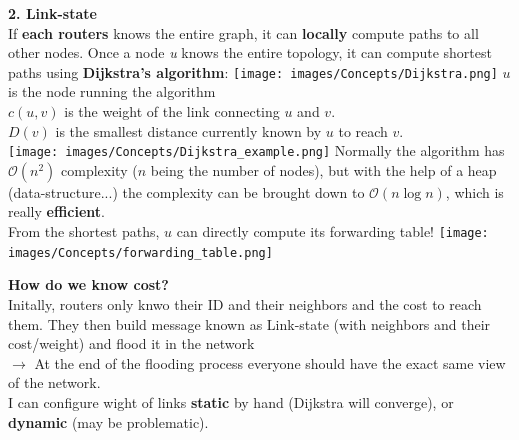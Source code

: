 \documentclass[a4paper, fontsize=8pt, landscape, DIV=1]{scrartcl}
\begin{document}
\begin{multicols*}{4}
		\textbf{2. Link-state}\\
		If \textbf{each routers} knows the entire graph, it can \textbf{locally}
		compute paths to all other nodes. Once a node \textit{u} knows the entire
		topology, it can compute shortest paths using \textbf{Dijkstra's algorithm}:
		\texttt{[image: images/Concepts/Dijkstra.png]}
		$u$ is the node running the algorithm\\
		$c(u,v)$ is the weight of the link connecting $u$ and $v$. \\
		$D(v)$ is the smallest distance currently known by $u$ to reach $v$.\\
		\texttt{[image: images/Concepts/Dijkstra\_example.png]} 
		Normally the algorithm has $\mathcal{O}(n^2)$ complexity ($n$ being the
		number of nodes), but with the help of a heap (data-structure...) the complexity
		can be brought down to $\mathcal{O}(n\log n)$, which is really
		\textbf{efficient}.\\
		From the shortest paths, $u$ can directly compute its forwarding table! 
		\texttt{[image: images/Concepts/forwarding\_table.png]}
		
		\textbf{How do we know cost?}\\
		Initally, routers only knwo their ID and their neighbors and the cost to
		reach them. They then build message known as Link-state (with neighbors and
		their cost/weight) and flood it in the network\\
		$\rightarrow$ At the end of the flooding process everyone should have the
		exact same view of the network. \\
		I can configure wight of links \textbf{static} by hand (Dijkstra will
		converge), or \textbf{dynamic} (may be problematic).\par 
		

\end{multicols*}
\end{document}
